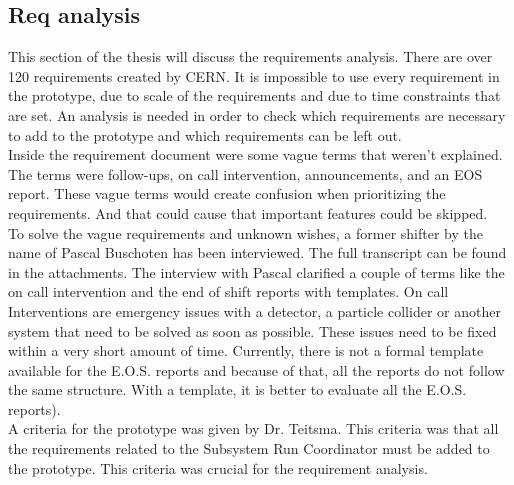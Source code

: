 \documentclass[paper=a4, fontsize=11pt,twoside]{scrartcl}	%
\begin{document}


\newpage
\subsection{Req analysis}
This section of the thesis will discuss the requirements analysis. There are over 120 requirements created by CERN. It is impossible to use every requirement in the prototype, due to scale of the requirements and due to time constraints that are set. An analysis is needed in order to check which requirements are necessary to add to the prototype and which requirements can be left out.  \\
Inside the requirement document were some vague terms that weren't explained. The terms were follow-ups, on call intervention, announcements, and an EOS report. These vague terms would create confusion when prioritizing the requirements. And that could cause that important features could be skipped. \\
To solve the vague requirements and unknown wishes, a former shifter by the name of Pascal Buschoten has been interviewed. The full transcript can be found in the attachments. The interview with Pascal clarified a couple of terms like the on call intervention and the end of shift reports with templates. On call Interventions are emergency issues with a detector, a particle collider or another system that need to be solved as soon as possible. These issues need to be fixed within a very short amount of time. Currently, there is not a formal template available for the E.O.S. reports  and because of that, all the reports do not follow the same structure. With a template, it is better to evaluate all the E.O.S. reports).\\
A criteria for the prototype was given by Dr. Teitsma. This criteria was that all the requirements related to the Subsystem Run Coordinator must be added to the prototype. This criteria was crucial for the requirement analysis. \\
\end{document}
